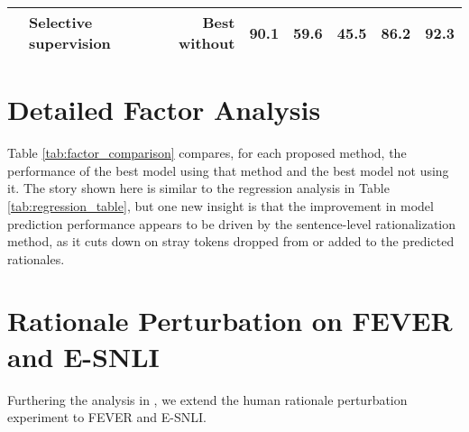 \begin{table*}[]
\begin{tabular}{@{}rlrrrrrr@{}}
                                                      & \textbf{Selective supervision}   & Best without                                       & 90.1                                                   & 59.6                            & 45.5                                   & 86.2                                & 92.3                                                                                                      \\ \bottomrule
\end{tabular}
\caption{Comparison of best model with each proposed factor against best model without that factor. }
\label{tab:factor_comparison}
\end{table*}

\section{Detailed Factor Analysis}

Table \ref{tab:factor_comparison} compares, for each proposed method, the performance of the best model using that method and the best model not using it. The story shown here is similar to the regression analysis in Table \ref{tab:regression_table}, but one new insight is that the improvement in model prediction performance appears to be driven by the sentence-level rationalization method, as it cuts down on stray tokens dropped from or added to the predicted rationales. 

\section{Rationale Perturbation on FEVER and E-SNLI}
\label{subsec:appendix-generalization}
Furthering the analysis in , we extend the human rationale perturbation experiment to FEVER and E-SNLI. 


